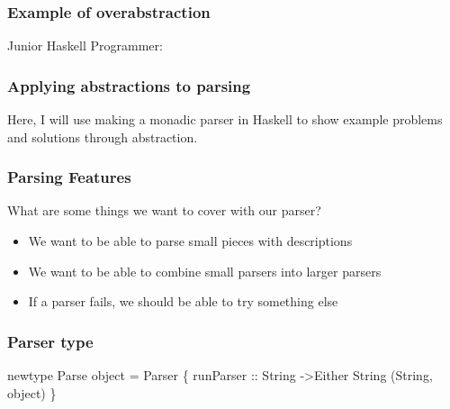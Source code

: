 \documentclass{beamer}
\begin{document}
\begin{frame}
\frametitle{Example of overabstraction}
Junior Haskell Programmer:








\end{frame}


\begin{frame}
\frametitle{Applying abstractions to parsing}
  Here, I will use making a monadic parser in Haskell 
  to show example problems and solutions through abstraction.
\end{frame}


\begin{frame}
\frametitle{Parsing Features}
  What are some things we want to cover with our parser?
  \begin{itemize}
    \item We want to be able to parse small pieces with descriptions
    \item We want to be able to combine small parsers into larger parsers
    \item If a parser fails, we should be able to try something else
  \end{itemize}
\end{frame}


\begin{frame}
\frametitle{Parser type}
  newtype Parse object = Parser \{ runParser :: String ->Either String (String, object) \}
\end{frame}
\end{document}
